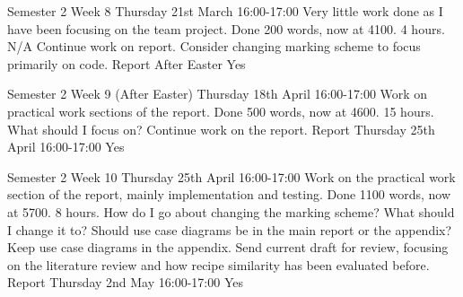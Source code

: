 \documentclass[../CHEFCookingHelper.tex]{subfiles}
\begin{document}
\logbookentry
{Semester 2 Week 8}
{Thursday 21st March 16:00-17:00}
{Very little work done as I have been focusing on the team project. Done 200 words, now at 4100.}
{4 hours.}
{N/A}
{Continue work on report. Consider changing marking scheme to focus primarily on code.}
{Report}
{After Easter}
{Yes}

\logbookentry
{Semester 2 Week 9 (After Easter)}
{Thursday 18th April 16:00-17:00}
{Work on practical work sections of the report. Done 500 words, now at 4600.}
{15 hours.}
{What should I focus on?}
{Continue work on the report.}
{Report}
{Thursday 25th April 16:00-17:00}
{Yes}

\logbookentry
{Semester 2 Week 10}
{Thursday 25th April 16:00-17:00}
{Work on the practical work section of the report, mainly implementation and testing.
Done 1100 words, now at 5700.}
{8 hours.}
{How do I go about changing the marking scheme? What should I change it to?
Should use case diagrams be in the main report or the appendix?}
{Keep use case diagrams in the appendix. Send current draft for review, focusing on
the literature review and how recipe similarity has been evaluated before.}
{Report}
{Thursday 2nd May 16:00-17:00}
{Yes}
\end{document}
